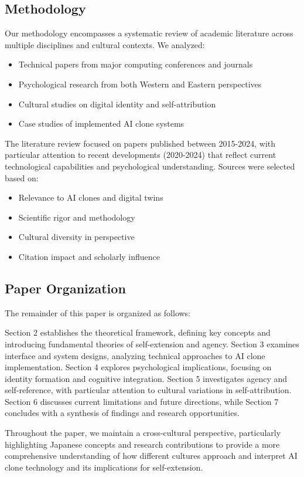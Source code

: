 \subsection{Methodology}

Our methodology encompasses a systematic review of academic literature across multiple disciplines and cultural contexts. We analyzed:
\begin{itemize}
\item Technical papers from major computing conferences and journals
\item Psychological research from both Western and Eastern perspectives
\item Cultural studies on digital identity and self-attribution
\item Case studies of implemented AI clone systems
\end{itemize}

The literature review focused on papers published between 2015-2024, with particular attention to recent developments (2020-2024) that reflect current technological capabilities and psychological understanding. Sources were selected based on:
\begin{itemize}
\item Relevance to AI clones and digital twins
\item Scientific rigor and methodology
\item Cultural diversity in perspective
\item Citation impact and scholarly influence
\end{itemize}

\subsection{Paper Organization}

The remainder of this paper is organized as follows:

Section 2 establishes the theoretical framework, defining key concepts and introducing fundamental theories of self-extension and agency. Section 3 examines interface and system designs, analyzing technical approaches to AI clone implementation. Section 4 explores psychological implications, focusing on identity formation and cognitive integration. Section 5 investigates agency and self-reference, with particular attention to cultural variations in self-attribution. Section 6 discusses current limitations and future directions, while Section 7 concludes with a synthesis of findings and research opportunities.

Throughout the paper, we maintain a cross-cultural perspective, particularly highlighting Japanese concepts and research contributions to provide a more comprehensive understanding of how different cultures approach and interpret AI clone technology and its implications for self-extension.
